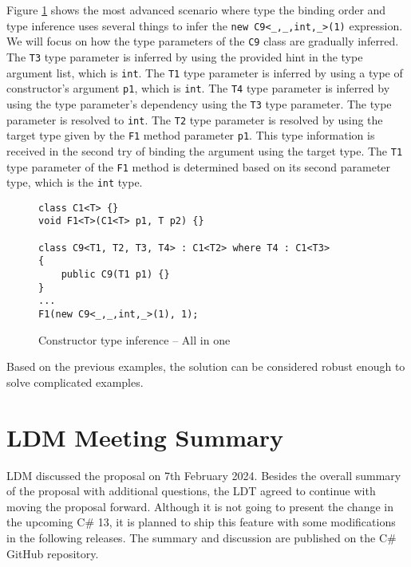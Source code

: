 \newpage

\par
Figure \ref{img79:example7} shows the most advanced scenario where type the binding order and type inference uses several things to infer the \texttt{new C9<\_,\_,int,\_>(1)} expression. 
We will focus on how the type parameters of the \texttt{C9} class are gradually inferred. 
The \texttt{T3} type parameter is inferred by using the provided hint in the type argument list, which is \texttt{int}. 
The \texttt{T1} type parameter is inferred by using a type of constructor’s argument \texttt{p1}, which is \texttt{int}.
The \texttt{T4} type parameter is inferred by using the type parameter’s dependency using the \texttt{T3} type parameter. 
The type parameter is resolved to \texttt{int}. 
The \texttt{T2} type parameter is resolved by using the target type given by the \texttt{F1} method parameter \texttt{p1}. 
This type information is received in the second try of binding the argument using the target type. 
The \texttt{T1} type parameter of the \texttt{F1} method is determined based on its second parameter type, which is the \texttt{int} type.
\begin{figure}[!h]
\begin{lstlisting}[style=csharp, showstringspaces=false]
class C1<T> {}
void F1<T>(C1<T> p1, T p2) {}

class C9<T1, T2, T3, T4> : C1<T2> where T4 : C1<T3>
{
    public C9(T1 p1) {}
}
...
F1(new C9<_,_,int,_>(1), 1);
\end{lstlisting}
\caption{Constructor type inference -- All in one}
\label{img79:example7}
\end{figure}
\par
Based on the previous examples, the solution can be considered robust enough to solve complicated examples.

\newpage

\section{LDM Meeting Summary}

LDM discussed the proposal on 7th February 2024. 
Besides the overall summary of the proposal with additional questions, the LDT agreed to continue with moving the proposal forward. 
Although it is not going to present the change in the upcoming C\# 13, it is planned to ship this feature with some modifications in the following releases. 
The summary \cite{online:mettingSummary} and discussion \cite{online:mettingSummaryDisc} are published on the C\# GitHub repository.